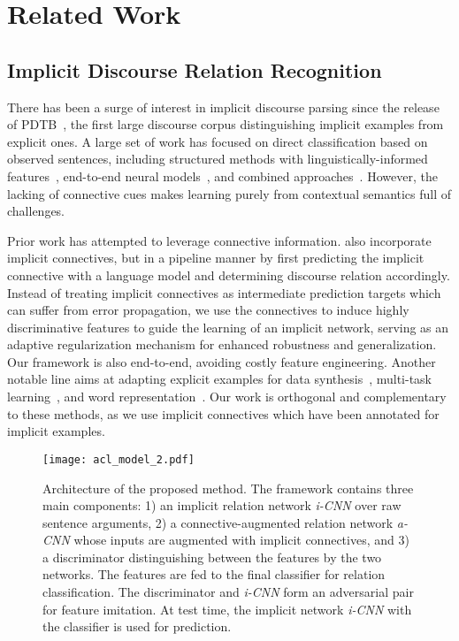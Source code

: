 \documentclass[11pt,a4paper]{article}
\begin{document}
\section{Related Work}\label{sec:related}

\subsection{Implicit Discourse Relation Recognition}
There has been a surge of interest in implicit discourse parsing since the release of PDTB~\cite{prasad2008penn}, the first large discourse corpus distinguishing implicit examples from explicit ones. A large set of work has focused on direct classification based on observed sentences, including structured methods with linguistically-informed features~\cite{lin2009recognizing,pitler-louis-nenkova:2009:ACLIJCNLP,zhou2010predicting}, end-to-end neural models~\cite{qin2016shallow,qin2016stacking,chen2016implicit,D16-1130}, and combined approaches~\cite{ji2015one,ji2016latent}. However, the lacking of connective cues makes learning purely from contextual semantics full of challenges.

Prior work has attempted to leverage connective information. 
 also incorporate implicit connectives, but in a pipeline manner by first predicting the implicit connective with a language model and determining discourse relation accordingly. Instead of treating implicit connectives as intermediate prediction targets which can suffer from error propagation, we use the connectives to induce highly discriminative features to guide the learning of an implicit network, serving as an adaptive regularization mechanism for enhanced robustness and generalization. Our framework is also end-to-end, avoiding costly feature engineering.
%
Another notable line aims at adapting explicit examples for data synthesis~\cite{biran2013aggregated,rutherford2015improving,braud2015comparing,ji2015closing}, multi-task learning~\cite{lan2013leveraging,liu2016implicit}, and word representation~\cite{braud2016learning}. Our work is orthogonal and complementary to these methods, as we use implicit connectives which have been annotated for implicit examples. 


\begin{figure*}[!h]
	\centering
	\texttt{[image: acl\_model\_2.pdf]}
	\caption{Architecture of the proposed method. The framework contains three main components: 1) an implicit relation network {\it i-CNN} over raw sentence arguments, 2) a connective-augmented relation network {\it a-CNN} whose inputs are augmented with implicit connectives, and 3) a discriminator distinguishing between the features by the two networks. The features are fed to the final classifier for relation classification. The discriminator and {\it i-CNN} form an adversarial pair for feature imitation. At test time, the implicit network {\it i-CNN} with the classifier is used for prediction.}
	\label{fig:model}
\end{figure*}
\end{document}
